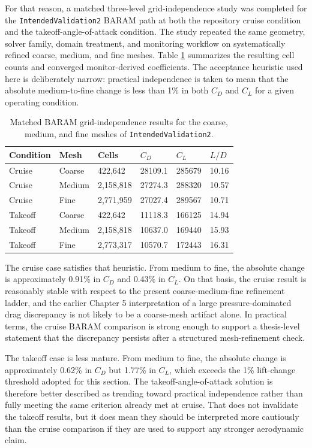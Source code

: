 \documentclass[12pt]{report}
\begin{document}
For that reason, a matched three-level grid-independence study was completed for the \texttt{IntendedValidation2} BARAM path at both the repository cruise condition and the takeoff-angle-of-attack condition. The study repeated the same geometry, solver family, domain treatment, and monitoring workflow on systematically refined coarse, medium, and fine meshes. Table \ref{tab:intendedvalidation2-grid-independence} summarizes the resulting cell counts and converged monitor-derived coefficients. The acceptance heuristic used here is deliberately narrow: practical independence is taken to mean that the absolute medium-to-fine change is less than 1\% in both \(C_D\) and \(C_L\) for a given operating condition.

\begin{table}[htbp]
\centering
\caption{Matched BARAM grid-independence results for the coarse, medium, and fine meshes of \texttt{IntendedValidation2}.}
\label{tab:intendedvalidation2-grid-independence}
\begin{tabular}{llllll}
\toprule
\textbf{Condition} & \textbf{Mesh} & \textbf{Cells} & \textbf{$C_D$} & \textbf{$C_L$} & \textbf{$L/D$} \\
\midrule
Cruise & Coarse & 422,642 & 28109.1 & 285679 & 10.16 \\
Cruise & Medium & 2,158,818 & 27274.3 & 288320 & 10.57 \\
Cruise & Fine & 2,771,959 & 27027.4 & 289567 & 10.71 \\
Takeoff & Coarse & 422,642 & 11118.3 & 166125 & 14.94 \\
Takeoff & Medium & 2,158,818 & 10637.0 & 169440 & 15.93 \\
Takeoff & Fine & 2,773,317 & 10570.7 & 172443 & 16.31 \\
\bottomrule
\end{tabular}
\end{table}

The cruise case satisfies that heuristic. From medium to fine, the absolute change is approximately 0.91\% in \(C_D\) and 0.43\% in \(C_L\). On that basis, the cruise result is reasonably stable with respect to the present coarse-medium-fine refinement ladder, and the earlier Chapter 5 interpretation of a large pressure-dominated drag discrepancy is not likely to be a coarse-mesh artifact alone. In practical terms, the cruise BARAM comparison is strong enough to support a thesis-level statement that the discrepancy persists after a structured mesh-refinement check.

The takeoff case is less mature. From medium to fine, the absolute change is approximately 0.62\% in \(C_D\) but 1.77\% in \(C_L\), which exceeds the 1\% lift-change threshold adopted for this section. The takeoff-angle-of-attack solution is therefore better described as trending toward practical independence rather than fully meeting the same criterion already met at cruise. That does not invalidate the takeoff results, but it does mean they should be interpreted more cautiously than the cruise comparison if they are used to support any stronger aerodynamic claim.
\end{document}
